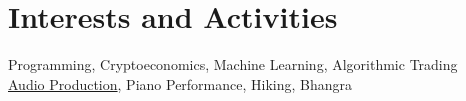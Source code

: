 \documentclass[a4paper,10.7pt]{article} %
\begin{document}

\section{Interests and Activities}
\vspace{1mm}
Programming, Cryptoeconomics, Machine Learning, Algorithmic Trading\\
\href{https://soundcloud.com/synapseproxy}{Audio Production}, Piano Performance, Hiking, Bhangra

\end{document}
